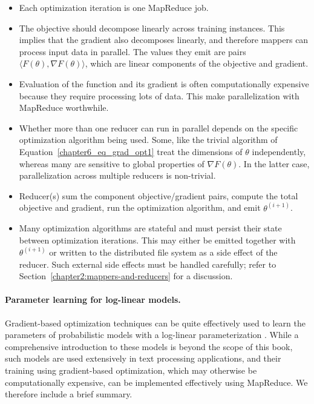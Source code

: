 \begin{itemize}

\item Each optimization iteration is one MapReduce job.

\item The objective should decompose linearly across training
  instances.  This implies that the gradient also decomposes linearly,
  and therefore mappers can process input data in parallel.  The
  values they emit are pairs $\langle F(\theta), \nabla F(\theta)
  \rangle$, which are linear components of the objective and gradient.

\item Evaluation of the function and its gradient is often
  computationally expensive because they require processing lots of
  data.  This make parallelization with MapReduce worthwhile.

\item Whether more than one reducer can run in parallel depends on the
  specific optimization algorithm being used.  Some, like the trivial
  algorithm of Equation~\ref{chapter6_eq_grad_opt1} treat the
  dimensions of $\theta$ independently, whereas many are sensitive to
  global properties of $\nabla F(\theta)$.  In the latter case,
  parallelization across multiple reducers is non-trivial.

\item Reducer(s) sum the component objective/gradient pairs, compute
  the total objective and gradient, run the optimization algorithm,
  and emit $\theta^{(i+1)}$.

\item Many optimization algorithms are stateful and must persist their
  state between optimization iterations.  This may either be emitted
  together with $\theta^{(i+1)}$ or written to the distributed file
  system as a side effect of the reducer. Such external side effects
  must be handled carefully; refer to
  Section~\ref{chapter2:mappers-and-reducers} for a discussion.

\end{itemize}


\paragraph{\bf Parameter learning for log-linear models.}
Gradient-based optimization techniques can be quite effectively used
to learn the parameters of probabilistic models with a log-linear
parameterization \cite{Malouf_2002}.  While a comprehensive
introduction to these models is beyond the scope of this book, such
models are used extensively in text processing applications, and their
training using gradient-based optimization, which may otherwise be
computationally expensive, can be implemented effectively using
MapReduce. We therefore include a brief summary.

